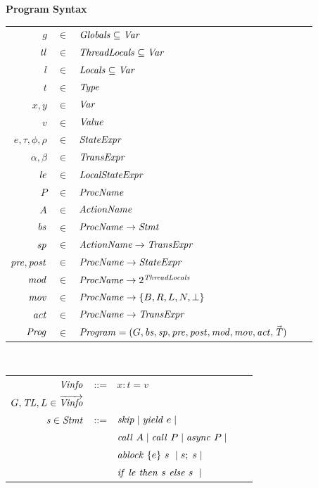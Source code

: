 \begin{figure}
\setlength{\tabcolsep}{3pt}
{\bf Program Syntax} \\
\begin{tabular}{rclcl}
$g$ & $\in$ & $\mathit{Globals} \subseteq \mathit{Var}$ \\
$\mathit{tl}$ & $\in$ & $\mathit{ThreadLocals} \subseteq \mathit{Var}$ \\
$l$ & $\in$ & $\mathit{Locals} \subseteq \mathit{Var}$ \\
$t$ & $\in$ & $\mathit{Type}$ \\
$x,y$ & $\in$ & $\mathit{Var}$ \\
$v$ &  $\in$ & $\mathit{Value}$ \\
$e, \tau, \phi, \rho$ & $\in$ & $\mathit{StateExpr}$ \\
$\alpha, \beta$ & $\in$ & $\mathit{TransExpr}$ \\
$\mathit{le}$ & $\in$ & $\mathit{LocalStateExpr}$ \\
$P$ & $\in$ & $\mathit{ProcName}$ \\
$A$ & $\in$ & $\mathit{ActionName}$ \\
$\mathit{bs}$ & $\in$ & $\mathit{ProcName} \rightarrow \mathit{Stmt}$ \\
$\mathit{sp}$ & $\in$ & $\mathit{ActionName} \rightarrow \mathit{TransExpr}$ \\
$\mathit{pre},\mathit{post}$ & $\in$ & $\mathit{ProcName} \rightarrow \mathit{StateExpr}$ \\
$\mathit{mod}$ & $\in$ & $\mathit{ProcName} \rightarrow 2^{\mathit{ThreadLocals}}$ \\
$\mathit{mov}$ & $\in$ & $\mathit{ProcName} \rightarrow \{B,R,L,N,\perp\}$ \\
$\mathit{act}$ & $\in$ & $\mathit{ProcName} \rightarrow \mathit{TransExpr}$ \\
$\mathit{Prog}$ & $\in$ & $\mathit{Program} = (G, \mathit{bs}, \mathit{sp}, \mathit{pre}, \mathit{post}, \mathit{mod}, \mathit{mov}, \mathit{act}, \vec{\mathit{T}})$ \\
\end{tabular}
~\\
\begin{tabular}{rclcl}
$\mathit{Vinfo}$ &::= & $x:t=v$ \\
$G,\mathit{TL},L \in \overrightarrow{\mathit{Vinfo}}$ \\
$\mathit{s} \in \mathit{Stmt}$ &::= & $\mathit{skip} \mid \mathit{yield}\ e \mid$ \\
                  & & $\mathit{call}\ A \mid \mathit{call}\ P \mid \mathit{async}\ P \mid $\\
                  & & $\mathit{ablock}\ {\{e\}}\ {s}\  \mid s;\;s \mid$\\
                 & & ${\mathit{if}\ {\mathit{le}}\ }{\mathit{then}\ {s}\ }{\mathit{else}\ {s}\ } \mid$ \\

\end{tabular}
\end{figure}
